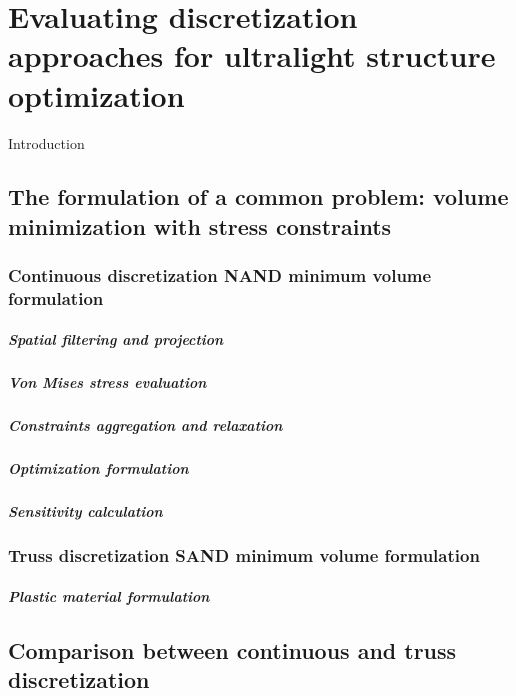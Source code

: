 \setchapterpreamble[u]{\margintoc}
\chapter{Evaluating discretization approaches for ultralight structure optimization}
Introduction
\section{The formulation of a common problem: volume minimization with stress constraints}

\subsection{Continuous discretization NAND minimum volume formulation}

\paragraph{Spatial filtering and projection}

\paragraph{Von Mises stress evaluation}

\paragraph{Constraints aggregation and relaxation}

\paragraph{Optimization formulation}

\paragraph{Sensitivity calculation}

\subsection{Truss discretization SAND minimum volume formulation}

\paragraph{Plastic material formulation}

\section{Comparison between continuous and truss discretization}

